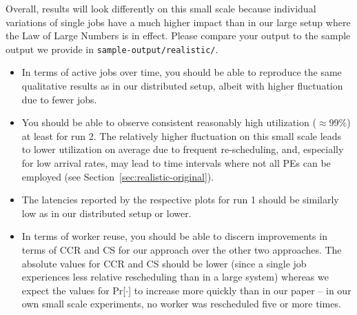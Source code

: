 \documentclass[runningheads]{article}
\numberwithin{dummy}{subsection}
\begin{document}
Overall, results will look differently on this small scale because individual variations of single jobs have a much higher impact than in our large setup where the Law of Large Numbers is in effect.
Please compare your output to the sample output we provide in \texttt{sample-output/realistic/}.
\begin{itemize}
 \item In terms of active jobs over time, you should be able to reproduce the same qualitative results as in our distributed setup, albeit with higher fluctuation due to fewer jobs.
 \item You should be able to observe consistent reasonably high utilization ($\approx 99\%$) at least for run 2.
 The relatively higher fluctuation on this small scale leads to lower utilization on average due to frequent re-scheduling, and, especially for low arrival rates, may lead to time intervals where not all PEs can be employed (see Section~\ref{sec:realistic-original}).
 \item The latencies reported by the respective plots for run 1 should be similarly low as in our distributed setup or lower.
 \item In terms of worker reuse, you should be able to discern improvements in terms of CCR and CS for our approach over the other two approaches.
 The absolute values for CCR and CS should be lower (since a single job experiences less relative rescheduling than in a large system) whereas we expect the values for Pr[$\cdot$] to increase more quickly than in our paper -- in our own small scale experiments, no worker was rescheduled five or more times.
\end{itemize}
\end{document}
